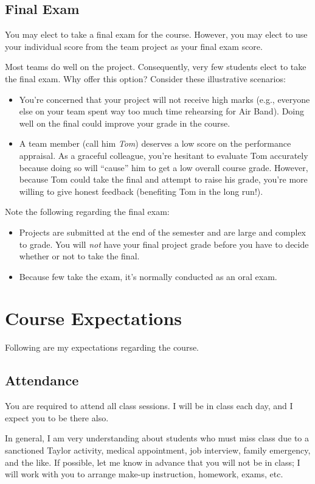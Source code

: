 \documentclass{article}
\begin{document}
\subsection{Final Exam}
\label{sec:orgheadline9}
You may elect to take a final exam for the course.
However, you may elect to use your individual score from the team
project as your final exam score.

Most teams do well on the project.
Consequently, very few students elect to take the final exam.
Why offer this option? Consider these illustrative scenarios:
\begin{itemize}
\item You're concerned that your project will not receive high marks
(e.g., everyone else on your team spent way too much time rehearsing for Air Band).
Doing well on the final could improve your grade in the course.
\item A team member (call him \emph{Tom}) deserves a low score on the performance appraisal.
As a graceful colleague, you're hesitant to evaluate Tom accurately
because doing so will ``cause'' him to get a low overall course grade.
However, because Tom could take the final and attempt to raise his grade,
you're more willing to give honest feedback (benefiting Tom in the long run!).
\end{itemize}

Note the following regarding the final exam:
\begin{itemize}
\item Projects are submitted at the end of the semester
and are large and complex to grade.
You will \emph{not} have your final project grade
before you have to decide whether or not to take the final.
\item Because few take the exam, it's normally conducted as an oral exam.
\end{itemize}
\section{Course Expectations}
\label{sec:orgheadline15}
Following are my expectations regarding the course.
\subsection{Attendance}
\label{sec:orgheadline11}
You are required to attend all class sessions.
I will be in class each day, and I expect you to be there also.

In general, I am very understanding about students who must miss class
due to a sanctioned Taylor activity, medical appointment, job interview,
family emergency, and the like.
If possible, let me know in advance that you will not be in class;
I will work with you to arrange make-up instruction, homework, exams, etc.
\end{document}
